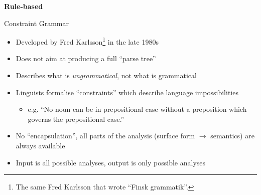 \documentclass{beamer}
\begin{document}
\begin{frame}
\centering
{\LARGE {\bf Rule-based } }
\end{frame}

\begin{frame}{Constraint Grammar}

    \begin{itemize}
      \item Developed by Fred Karlsson\footnote{The same Fred Karlsson that wrote ``Finsk grammatik''.} in the late 1980s
      \item Does not aim at producing a full ``parse tree''
      \item Describes what is \emph{ungrammatical}, not what is grammatical
      \item Linguists formalise ``constraints'' which describe language impossibilities
      \begin{itemize}
        \item e.g. ``No noun can be in prepositional case without a preposition which 
          governs the prepositional case.''
      \end{itemize}
      \item No ``encapsulation'', all parts of the analysis (surface form $\rightarrow$ semantics) are always available
      \item Input is all possible analyses, output is only possible analyses
    \end{itemize}

\end{frame}
\end{document}
